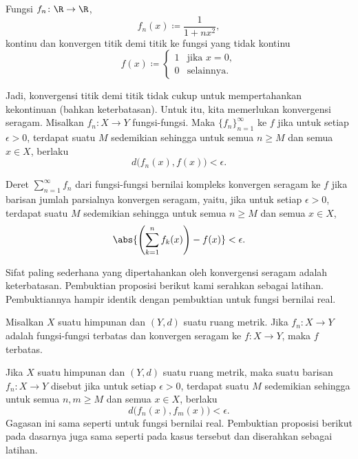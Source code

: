 \begin{example}
Fungsi $f_n \colon \R \to \R$,
\begin{equation*}
f_n(x) \coloneqq \frac{1}{1+nx^2},
\end{equation*}
kontinu dan konvergen titik demi titik ke fungsi yang tidak kontinu
\begin{equation*}
f(x) \coloneqq 
\begin{cases}
1 & \text{jika } x=0, \\
0 & \text{selainnya.}
\end{cases}
\end{equation*}
\end{example}

Jadi, konvergensi titik demi titik tidak cukup untuk mempertahankan kekontinuan
(bahkan keterbatasan). Untuk itu, kita memerlukan konvergensi seragam.
Misalkan $f_n \colon X \to Y$ fungsi-fungsi. Maka
$\{f_n\}_{n=1}^\infty$ \emph{}
ke $f$ jika
untuk setiap $\epsilon > 0$, terdapat suatu $M$ sedemikian sehingga
untuk semua $n \geq M$ dan semua $x \in X$, berlaku
\begin{equation*}
d\bigl(f_n(x),f(x)\bigr) < \epsilon .
\end{equation*}

Deret $\sum_{n=1}^\infty f_n$ dari fungsi-fungsi bernilai kompleks konvergen seragam
ke $f$ jika barisan
jumlah parsialnya konvergen seragam, yaitu, jika untuk setiap $\epsilon > 0$,
terdapat suatu $M$ sedemikian sehingga
untuk semua $n \geq M$ dan semua $x \in X$,
\begin{equation*}
\abs{\left(\sum_{k=1}^n f_k(x)\right)-f(x)} < \epsilon .
\end{equation*}

Sifat paling sederhana yang dipertahankan oleh konvergensi seragam adalah
keterbatasan. Pembuktian proposisi berikut kami serahkan sebagai
latihan. Pembuktiannya hampir identik dengan pembuktian untuk fungsi bernilai real.

\begin{prop} \label{prop:uniformconvbounded}
Misalkan $X$ suatu himpunan dan $(Y,d)$ suatu ruang metrik.
Jika $f_n \colon X \to Y$ adalah fungsi-fungsi terbatas dan konvergen seragam ke $f
\colon X \to Y$, maka $f$ terbatas.
\end{prop}

Jika $X$ suatu himpunan dan $(Y,d)$ suatu ruang metrik, maka suatu barisan $f_n \colon X
\to Y$ disebut \emph{} jika untuk setiap $\epsilon > 0$, terdapat suatu $M$ sedemikian sehingga
untuk semua $n, m \geq M$ dan semua $x \in X$, berlaku
\begin{equation*}
d\bigl(f_n(x),f_m(x)\bigr) < \epsilon .
\end{equation*}
Gagasan ini sama seperti untuk fungsi bernilai real.
Pembuktian proposisi berikut
pada dasarnya juga sama seperti pada kasus tersebut dan
diserahkan sebagai latihan.

